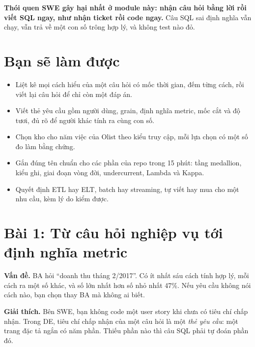 \textbf{Thói quen SWE gây hại nhất ở module này: nhận câu hỏi bằng lời rồi viết SQL ngay, như nhận ticket rồi code ngay.} Câu SQL sai định nghĩa vẫn chạy, vẫn trả về một con số trông hợp lý, và không test nào đỏ.

\section{Bạn sẽ làm được}

\begin{itemize}
  \item Liệt kê mọi cách hiểu của một câu hỏi có mốc thời gian, đếm từng cách, rồi viết lại câu hỏi để chỉ còn một đáp án.
  \item Viết thẻ yêu cầu gồm người dùng, grain, định nghĩa metric, mốc cắt và độ tươi, đủ rõ để người khác tính ra cùng con số.
  \item Chọn kho cho năm việc của Olist theo kiểu truy cập, mỗi lựa chọn có một số đo làm bằng chứng.
  \item Gắn đúng tên chuẩn cho các phần của repo trong 15 phút: tầng medallion, kiểu ghi, giai đoạn vòng đời, undercurrent, Lambda và Kappa.
  \item Quyết định ETL hay ELT, batch hay streaming, tự viết hay mua cho một nhu cầu, kèm lý do kiểm được.
\end{itemize}

\section{Bài 1: Từ câu hỏi nghiệp vụ tới định nghĩa metric}

\textbf{Vấn đề.} BA hỏi ``doanh thu tháng 2/2017''. Có ít nhất sáu cách tính hợp lý, mỗi cách ra một số khác, và số lớn nhất hơn số nhỏ nhất 47\%. Nếu yêu cầu không nói cách nào, bạn chọn thay BA mà không ai biết.

\textbf{Giải thích.} Bên SWE, bạn không code một user story khi chưa có tiêu chí chấp nhận. Trong DE, tiêu chí chấp nhận của một câu hỏi là một \textit{thẻ yêu cầu}: một trang đặc tả ngắn có năm phần. Thiếu phần nào thì câu SQL phải tự đoán phần đó.


